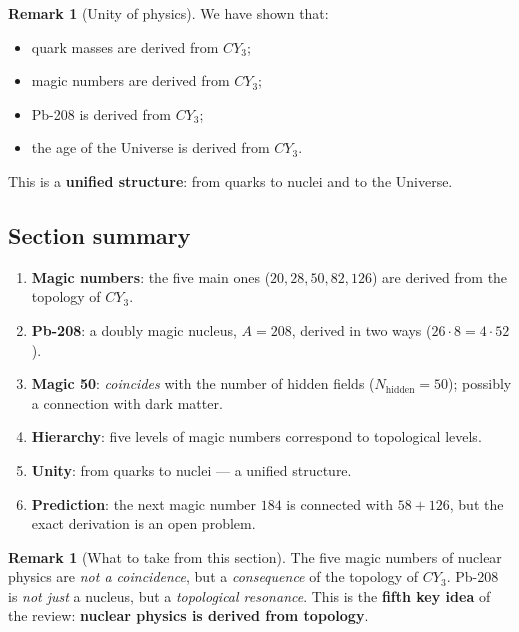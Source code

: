 \documentclass[11pt,a4paper]{article}
\newcommand{\CY}{CY_3}
\newcommand{\Nhidden}{N_{\text{hidden}}}
\theoremstyle{definition}
\newtheorem{remark}[theorem]{Remark}
\begin{document}
\begin{remark}[Unity of physics]
\label{rem:quark-nuclei-unity}
We have shown that:
\begin{itemize}
    \item quark masses are derived from $\CY$;
    \item magic numbers are derived from $\CY$;
    \item Pb-208 is derived from $\CY$;
    \item the age of the Universe is derived from $\CY$.
\end{itemize}
This is a \textbf{unified structure}: from quarks to nuclei and to the Universe.
\end{remark}

\subsection{Section summary}
\label{subsec:magic-summary}

\begin{enumerate}
    \item \textbf{Magic numbers}: the five main ones 
          ($20, 28, 50, 82, 126$) are derived from the topology of $\CY$.
    \item \textbf{Pb-208}: a doubly magic nucleus, 
          $A = 208$, derived in two ways 
          ($26 \cdot 8 = 4 \cdot 52$).
    \item \textbf{Magic 50}: \emph{coincides} with the number 
          of hidden fields ($\Nhidden = 50$); possibly a connection 
          with dark matter.
    \item \textbf{Hierarchy}: five levels of magic numbers 
          correspond to topological levels.
    \item \textbf{Unity}: from quarks to nuclei — a unified 
          structure.
    \item \textbf{Prediction}: the next magic number $184$ 
          is connected with $58 + 126$, but the exact derivation is an open 
          problem.
\end{enumerate}

\begin{remark}[What to take from this section]
\label{rem:magic-takeaway}
The five magic numbers of nuclear physics are \emph{not a coincidence}, 
but a \emph{consequence} of the topology of $\CY$. Pb-208 is \emph{not just} 
a nucleus, but a \emph{topological resonance}. This is the 
\textbf{fifth key idea} of the review: \textbf{nuclear physics 
is derived from topology}.
\end{remark}
\end{document}
